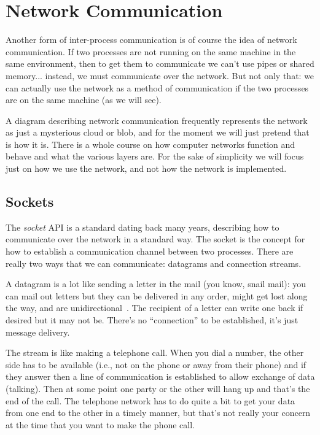 




\section*{Network Communication}

Another form of inter-process communication is of course the idea of network communication. If two processes are not running on the same machine in the same environment, then to get them to communicate we can't use pipes or shared memory... instead, we must communicate over the network. But not only that: we can actually use the network as a method of communication if the two processes are on the same machine (as we will see). 

A diagram describing network communication frequently represents the network as just a mysterious cloud or blob, and for the moment we will just pretend that is how it is. There is a whole course on how computer networks function and behave and what the various layers are. For the sake of simplicity we will focus just on how we use the network, and not how the network is implemented.

\subsection*{Sockets}

The \textit{socket} API is a standard dating back many years, describing how to communicate over the network in a standard way. The socket is the concept for how to establish a communication channel between two processes. There are really two ways that we can communicate: datagrams and connection streams.

A datagram is a lot like sending a letter in the mail (you know, snail mail): you can mail out letters but they can be delivered in any order, might get lost along the way, and are unidirectional~\cite{apunix}. The recipient of a letter can write one back if desired but it may not be. There's no ``connection'' to be established, it's just message delivery.

The stream is like making a telephone call. When you dial a number, the other side has to be available (i.e., not on the phone or away from their phone) and if they answer then a line of communication is established to allow exchange of data (talking). Then at some point one party or the other will hang up and that's the end of the call. The telephone network has to do quite a bit to get your data from one end to the other in a timely manner, but that's not really your concern at the time that you want to make the phone call.


